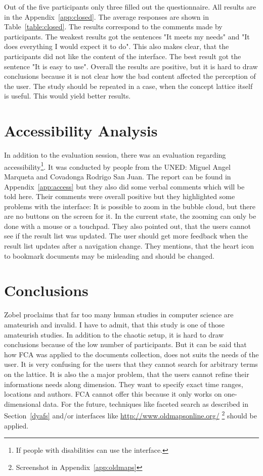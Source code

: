 \documentclass[11pt]{report}
\begin{document}
Out of the five participants only three filled out the questionnaire. All results are in the Appendix~\ref{app:closed}. The average responses are shown in Table~\ref{table:closed}. The results correspond to the comments made by participants. The weakest results got the sentences "It meets my needs" and "It does everything I would expect it to do". This also makes clear, that the participants did not like the content of the interface. The best result got the sentence "It is easy to use". Overall the results are positive, but it is hard to draw conclusions because it is not clear how the bad content affected the perception of the user. The study should be repeated in a case, when the concept lattice itself is useful. This would yield better results.

\section{Accessibility Analysis}

In addition to the evaluation session, there was an evaluation regarding accessibility\footnote{If people with disabilities can use the interface.}. It was conducted by people from the UNED: Miguel Angel Marqueta and Covadonga Rodrigo San Juan. The report can be found in Appendix~\ref{app:access} but they also did some verbal comments which will be told here. Their comments were overall positive but they highlighted some problems with the interface: It is possible to zoom in the bubble cloud, but there are no buttons on the screen for it. In the current state, the zooming can only be done with a mouse or a touchpad. They also pointed out, that the users cannot see if the result list was updated. The user should get more feedback when the result list updates after a navigation change. They mentions, that the heart icon to bookmark documents may be misleading and should be changed. 

\section{Conclusions} 
Zobel \cite{Zobel2004} proclaims that far too many human studies in computer science are amateurish and invalid. I have to admit, that this study is one of those amateurish studies. In addition to the chaotic setup, it is hard to draw conclusions because of the low number of participants. But it can be said that how FCA was applied to the documents collection, does not suits the needs of the user. It is very confusing for the users that they cannot search for arbitrary terms on the lattice. It is also the a major problem, that the users cannot refine their informations needs along dimension. They want to specify exact time ranges, locations and authors. FCA cannot offer this because it only works on one-dimensional data. For the future, techniques like faceted search as described in Section~\ref{dyafs} and/or interfaces like \url{http://www.oldmapsonline.org/} \footnote{Screenshot in Appendix~\ref{app:oldmaps}} should be applied.\\
 
\end{document}
